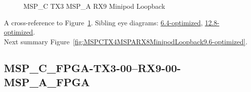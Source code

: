 \begin{figure}[h]
\begin{subfigure}{0.33\textwidth}
\hyperref[sec:MSPCFPGATX306RX906MSPAFPGA9.6-optimized]{}
\end{subfigure}\hspace*{\fill}
\begin{subfigure}{0.33\textwidth}
\hyperref[sec:MSPCFPGATX307RX907MSPAFPGA9.6-optimized]{}
\end{subfigure}\hspace*{\fill}
\begin{subfigure}{0.33\textwidth}
\hyperref[sec:MSPCFPGATX308RX908MSPAFPGA9.6-optimized]{}
\end{subfigure}

\begin{subfigure}{0.33\textwidth}
\hyperref[sec:MSPCFPGATX309RX909MSPAFPGA9.6-optimized]{}
\end{subfigure}\hspace*{\fill}
\begin{subfigure}{0.33\textwidth}
\hyperref[sec:MSPCFPGATX310RX910MSPAFPGA9.6-optimized]{}
\end{subfigure}\hspace*{\fill}
\begin{subfigure}{0.33\textwidth}
\hyperref[sec:MSPCFPGATX311RX911MSPAFPGA9.6-optimized]{}
\end{subfigure}

\caption{MSP\_C TX3 MSP\_A RX9 Minipod Loopback} \label{fig:MSPCTX3MSPARX9MinipodLoopback9.6-optimized}
\end{figure}

A cross-reference to Figure~\ref{fig:MSPCTX3MSPARX9MinipodLoopback9.6-optimized}.
Sibling eye diagrams: \hyperref[sec:MSPCTX3MSPARX9MinipodLoopback6.4-optimized]{6.4-optimized}, \hyperref[sec:MSPCTX3MSPARX9MinipodLoopback12.8-optimized]{12.8-optimized}. \\
Next summary Figure~\ref{fig:MSPCTX4MSPARX8MinipodLoopback9.6-optimized}.
\clearpage
% 
\subsection{MSP\_C\_FPGA-TX3-00--RX9-00-MSP\_A\_FPGA}\label{sec:MSPCFPGATX300RX900MSPAFPGA9.6-optimized}

